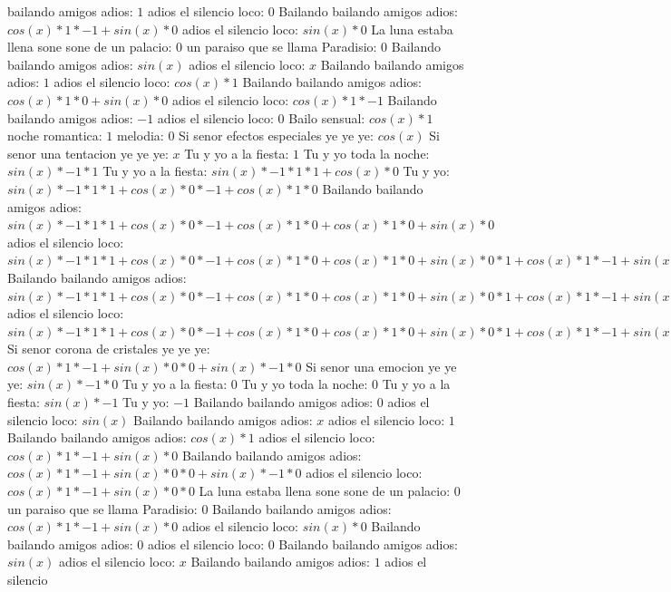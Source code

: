 \documentclass{article}
\begin{document}
bailando amigos adios: $1$ adios el silencio loco: $0$  \newline Bailando bailando amigos adios: $cos(x)*1*-1+sin(x)*0$  \newline adios el silencio loco: $sin(x)*0$ La luna estaba llena sone sone de un palacio: $0$ un paraiso que se llama Paradisio: $0$  \newline Bailando bailando amigos adios: $sin(x)$  \newline adios el silencio loco: $x$ Bailando bailando amigos adios: $1$  \newline adios el silencio loco: $cos(x)*1$ Bailando bailando amigos adios: $cos(x)*1*0+sin(x)*0$ adios el silencio loco: $cos(x)*1*-1$ Bailando bailando amigos adios: $-1$ adios el silencio loco: $0$  \newline Bailo sensual: $cos(x)*1$ noche romantica: $1$ melodia: $0$  \newline Si senor efectos especiales ye ye ye: $cos(x)$  \newline Si senor una tentacion ye ye ye: $x$ Tu y yo a la fiesta: $1$  \newline Tu y yo toda la noche: $sin(x)*-1*1$ Tu y yo a la fiesta: $sin(x)*-1*1*1+cos(x)*0$ Tu y yo: ${sin(x)*-1*1*1+cos(x)*0}*-1+cos(x)*1*0$ Bailando bailando amigos adios: ${sin(x)*-1*1*1+cos(x)*0}*-1+cos(x)*1*0+cos(x)*1*0+sin(x)*0$ adios el silencio loco: ${{sin(x)*-1*1*1+cos(x)*0}*-1+cos(x)*1*0+cos(x)*1*0+sin(x)*0}*1+{cos(x)*1*-1+sin(x)*0}*0$ Bailando bailando amigos adios: ${{sin(x)*-1*1*1+cos(x)*0}*-1+cos(x)*1*0+cos(x)*1*0+sin(x)*0}*1+{cos(x)*1*-1+sin(x)*0}*0+{cos(x)*1*-1+sin(x)*0}*0+sin(x)*-1*0$ adios el silencio loco: ${{sin(x)*-1*1*1+cos(x)*0}*-1+cos(x)*1*0+cos(x)*1*0+sin(x)*0}*1+{cos(x)*1*-1+sin(x)*0}*0+{cos(x)*1*-1+sin(x)*0}*0+sin(x)*-1*0$  \newline Si senor corona de cristales ye ye ye: ${cos(x)*1*-1+sin(x)*0}*0+sin(x)*-1*0$  \newline Si senor una emocion ye ye ye: $sin(x)*-1*0$ Tu y yo a la fiesta: $0$ Tu y yo toda la noche: $0$  \newline Tu y yo a la fiesta: $sin(x)*-1$ Tu y yo: $-1$ Bailando bailando amigos adios: $0$  \newline adios el silencio loco: $sin(x)$  \newline Bailando bailando amigos adios: $x$ adios el silencio loco: $1$  \newline Bailando bailando amigos adios: $cos(x)*1$ adios el silencio loco: $cos(x)*1*-1+sin(x)*0$ Bailando bailando amigos adios: ${cos(x)*1*-1+sin(x)*0}*0+sin(x)*-1*0$ adios el silencio loco: ${cos(x)*1*-1+sin(x)*0}*0$ La luna estaba llena sone sone de un palacio: $0$ un paraiso que se llama Paradisio: $0$  \newline Bailando bailando amigos adios: $cos(x)*1*-1+sin(x)*0$  \newline adios el silencio loco: $sin(x)*0$ Bailando bailando amigos adios: $0$ adios el silencio loco: $0$  \newline Bailando bailando amigos adios: $sin(x)$  \newline adios el silencio loco: $x$ Bailando bailando amigos adios: $1$  \newline adios el silencio 
\end{document}

